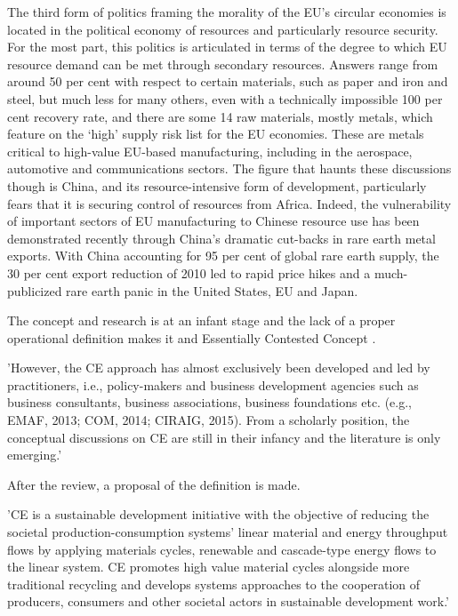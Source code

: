 The third form of politics framing the morality of the EU’s circular economies is located in the political economy of resources and particularly resource security. For the most part, this politics is articulated in terms of the degree to which EU resource demand can be met through secondary resources. Answers range from around 50 per cent with respect to certain materials, such as paper and iron and steel, but much less for many others, even with a technically impossible 100 per cent recovery rate, and there are some 14 raw materials, mostly metals, which feature on the ‘high’ supply risk list for the EU economies. These are metals critical to high-value EU-based manufacturing, including in the aerospace, automotive and communications sectors. The figure that haunts these discussions though is China, and its resource-intensive form of development, particularly fears that it is securing control of resources from Africa. Indeed, the vulnerability of important sectors of EU manufacturing to Chinese resource use has been demonstrated recently through China’s dramatic cut-backs in rare earth metal exports. With China accounting for 95 per cent of global rare earth supply, the 30 per cent export reduction of 2010 led to rapid price hikes and a much-publicized rare earth panic in the United States, EU and Japan.






The concept and research is at an infant stage and the lack of a proper operational definition makes it and Essentially Contested Concept \parencite{Korhonen2018}. 

'However, the CE approach has almost exclusively been developed and led by practitioners, i.e., policy-makers and business development agencies such as business consultants, business associations, business foundations etc. (e.g., EMAF, 2013; COM, 2014; CIRAIG, 2015). From a scholarly position, the conceptual discussions on CE are still in their infancy and the literature is only emerging.'

After the review, a proposal of the definition is made.

'CE is a sustainable development initiative with the objective of reducing the societal production-consumption systems' linear material and energy throughput flows by applying materials cycles, renewable and cascade-type energy flows to the linear system. CE promotes high value material cycles alongside more traditional recycling and develops systems approaches to the cooperation of producers, consumers and other societal actors in sustainable development work.' 


